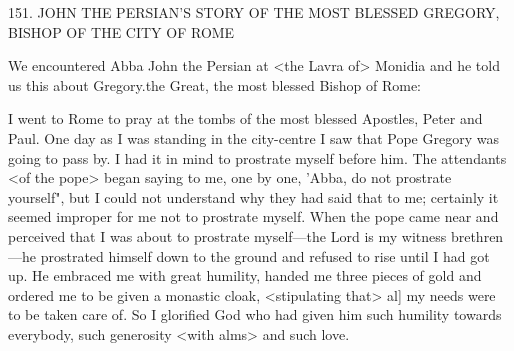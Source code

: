 151. JOHN THE PERSIAN'S STORY OF THE
MOST BLESSED GREGORY,
BISHOP OF THE CITY OF ROME

We encountered Abba John the Persian at <the Lavra of> Monidia
and he told us this about Gregory.the Great, the most blessed
Bishop of Rome:

I went to Rome to pray at the tombs of the most blessed Apostles,
Peter and Paul. One day as I was standing in the city-centre I saw
that Pope Gregory was going to pass by. I had it in mind to
prostrate myself before him. The attendants <of the pope> began
saying to me, one by one, 'Abba, do not prostrate yourself", but I
could not understand why they had said that to me; certainly it
seemed improper for me not to prostrate myself. When the pope
came near and perceived that I was about to prostrate myself—the
Lord is my witness brethren—he prostrated himself down to the
ground and refused to rise until I had got up. He embraced me with
great humility, handed me three pieces of gold and ordered me to
be given a monastic cloak, <stipulating that> al] my needs were to
be taken care of. So I glorified God who had given him such
humility towards everybody, such generosity <with alms> and such
love.

